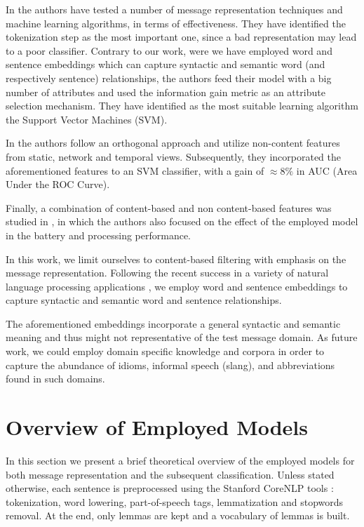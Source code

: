 \documentclass[letterpaper]{article}
\begin{document}
In \cite{gomez2006content} the authors have tested a number of message representation techniques and machine learning algorithms, in terms of effectiveness. They have identified the tokenization step as the most important one, since a bad representation may lead to a poor classifier. Contrary to our work, were we have employed word and sentence embeddings which can capture syntactic and semantic word (and respectively sentence) relationships, the authors feed their model with a big number of attributes and used the information gain metric \cite{yang1999evaluation} as an attribute selection mechanism. They have identified as the most suitable learning algorithm the Support Vector Machines (SVM).

In \cite{6133257} the authors follow an orthogonal approach and utilize non-content features from static, network and temporal views. Subsequently, they incorporated the aforementioned features to an SVM classifier, with a gain of $\approx 8\%$ in AUC (Area Under the ROC Curve).

Finally, a combination of content-based and non content-based features was studied in \cite{sulaiman2016new}, in which the authors also focused on the effect of the employed model in the battery and processing performance.

In this work, we limit ourselves to content-based filtering with emphasis on the message representation. Following the recent success in a variety of natural language processing applications \cite{mikolov2013distributed} \cite{bojanowski2016enriching} \cite{pagliardini2017unsupervised}, we employ word and sentence embeddings to capture syntactic and semantic word and sentence relationships.

The aforementioned embeddings incorporate a general syntactic and semantic meaning and thus might not representative of the test message domain. As future work, we could employ domain specific knowledge and corpora in order to capture the abundance of idioms, informal speech (slang), and abbreviations found in such domains.

\section{Overview of Employed Models} \label{Overview}

In this section we present a brief theoretical overview of the employed models for both message representation and the subsequent classification. Unless stated otherwise, each sentence is preprocessed using the Stanford CoreNLP tools \cite{manning-EtAl2014}: tokenization, word lowering, part-of-speech tags, lemmatization and stopwords removal. At the end, only lemmas are kept and a vocabulary of lemmas is built.
\end{document}
